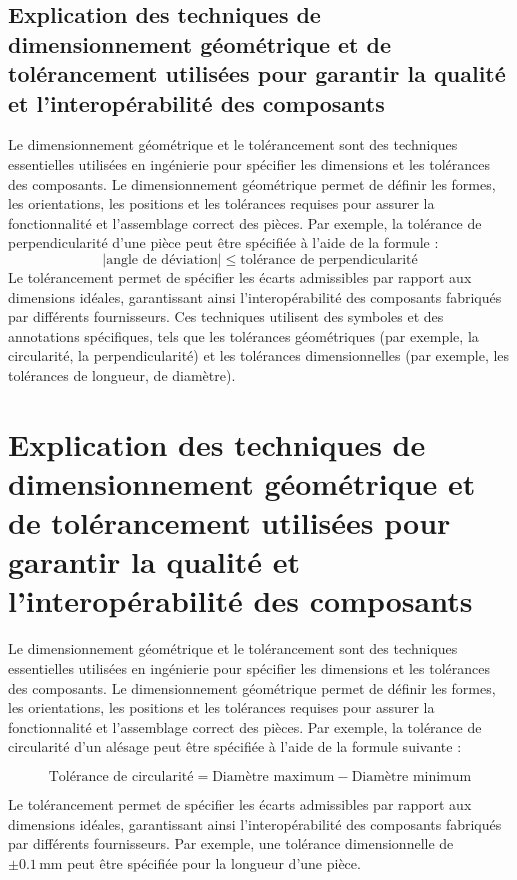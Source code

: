 \documentclass{article}
\begin{document}
\subsection{Explication des techniques de dimensionnement géométrique et de tolérancement utilisées pour garantir la qualité et l'interopérabilité des composants}
Le dimensionnement géométrique et le tolérancement sont des techniques essentielles utilisées en ingénierie pour spécifier les dimensions et les tolérances des composants. Le dimensionnement géométrique permet de définir les formes, les orientations, les positions et les tolérances requises pour assurer la fonctionnalité et l'assemblage correct des pièces. Par exemple, la tolérance de perpendicularité d'une pièce peut être spécifiée à l'aide de la formule :
\[ | \text{angle de déviation} | \leq \text{tolérance de perpendicularité} \]
Le tolérancement permet de spécifier les écarts admissibles par rapport aux dimensions idéales, garantissant ainsi l'interopérabilité des composants fabriqués par différents fournisseurs. Ces techniques utilisent des symboles et des annotations spécifiques, tels que les tolérances géométriques (par exemple, la circularité, la perpendicularité) et les tolérances dimensionnelles (par exemple, les tolérances de longueur, de diamètre).



\section{Explication des techniques de dimensionnement géométrique et de tolérancement utilisées pour garantir la qualité et l'interopérabilité des composants}

Le dimensionnement géométrique et le tolérancement sont des techniques essentielles utilisées en ingénierie pour spécifier les dimensions et les tolérances des composants. Le dimensionnement géométrique permet de définir les formes, les orientations, les positions et les tolérances requises pour assurer la fonctionnalité et l'assemblage correct des pièces. Par exemple, la tolérance de circularité d'un alésage peut être spécifiée à l'aide de la formule suivante :

\[
\text{{Tolérance de circularité}} = \text{{Diamètre maximum}} - \text{{Diamètre minimum}}
\]

Le tolérancement permet de spécifier les écarts admissibles par rapport aux dimensions idéales, garantissant ainsi l'interopérabilité des composants fabriqués par différents fournisseurs. Par exemple, une tolérance dimensionnelle de \(\pm 0.1 \, \text{{mm}}\) peut être spécifiée pour la longueur d'une pièce.
\end{document}
